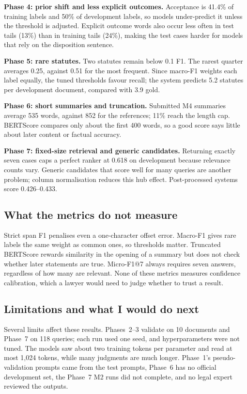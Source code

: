 \documentclass[11pt, oneside]{article}
\begin{document}
\textbf{Phase 4: prior shift and less explicit outcomes.} Acceptance is 41.4\% of training labels and 50\% of
development labels, so models under-predict it unless the threshold is adjusted. Explicit outcome words also occur
less often in test tails (13\%) than in training tails (24\%), making the test cases harder for models that rely on
the disposition sentence.

\textbf{Phase 5: rare statutes.} Two statutes remain below 0.1 F1. The rarest quarter averages 0.25, against 0.51
for the most frequent. Since macro-F1 weights each label equally, the tuned thresholds favour recall; the system
predicts 5.2 statutes per development document, compared with 3.9 gold.

\textbf{Phase 6: short summaries and truncation.} Submitted M4 summaries average 535 words, against 852 for the
references; 11\% reach the length cap. BERTScore compares only about the first 400 words, so a good score says
little about later content or factual accuracy.

\textbf{Phase 7: fixed-size retrieval and generic candidates.} Returning exactly seven cases caps a perfect ranker
at 0.618 on development because relevance counts vary. Generic candidates that score well for many queries are
another problem; column normalisation reduces this hub effect. Post-processed systems score 0.426--0.433.

\subsection{What the metrics do not measure}
Strict span F1 penalises even a one-character offset error. Macro-F1 gives rare labels the same weight as common
ones, so thresholds matter. Truncated BERTScore rewards similarity in the opening of a summary but does not check
whether later statements are true. Micro-F1@7 always requires seven answers, regardless of how many are relevant.
None of these metrics measures confidence calibration, which a lawyer would need to judge whether to trust a result.

\subsection{Limitations and what I would do next}
Several limits affect these results. Phases~2--3 validate on 10 documents and Phase~7 on 118 queries; each run used
one seed, and hyperparameters were not tuned. The models saw about two training tokens per parameter and read at
most 1{,}024 tokens, while many judgments are much longer. Phase~1's pseudo-validation prompts came from the test
prompts, Phase~6 has no official development set, the Phase~7 M2 runs did not complete, and no legal expert reviewed
the outputs.
\end{document}
